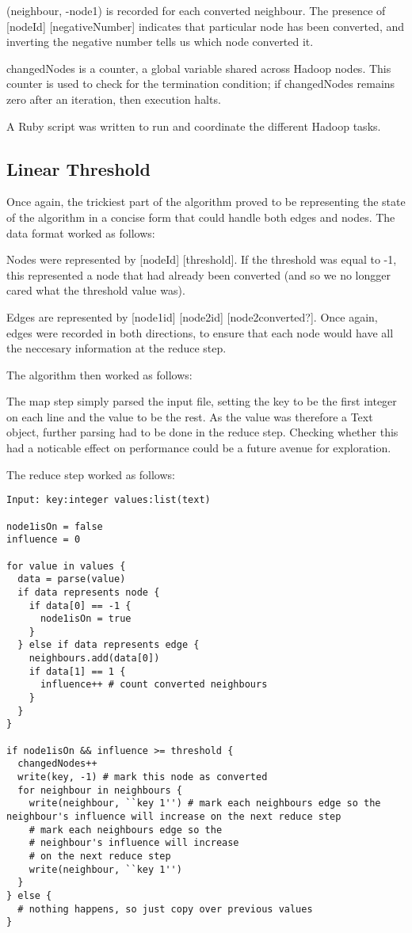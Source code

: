 (neighbour, -node1) is recorded for each converted neighbour. The presence of [nodeId] [negativeNumber] indicates that particular node has been converted, and inverting the negative number tells us which node converted it.

changedNodes is a counter, a global variable shared across Hadoop nodes. This counter is used to check for the termination condition; if changedNodes remains zero after an iteration, then execution halts.

A Ruby script was written to run and coordinate the different Hadoop tasks.

\subsection{Linear Threshold}

Once again, the trickiest part of the algorithm proved to be representing the state of the algorithm in a concise form that could handle both edges and nodes. The data format worked as follows:

Nodes were represented by [nodeId] [threshold]. If the threshold was equal to -1, this represented a node that had already been converted (and so we no longger cared what the threshold value was).

Edges are represented by [node1id] [node2id] [node2converted?]. Once again, edges were recorded in both directions, to ensure that each node would have all the neccesary information at the reduce step.

The algorithm then worked as follows:

The map step simply parsed the input file, setting the key to be the first integer on each line and the value to be the rest. As the value was therefore a Text object, further parsing had to be done in the reduce step. Checking whether this had a noticable effect on performance could be a future avenue for exploration.

The reduce step worked as follows:

\begin{verbatim}
Input: key:integer values:list(text)

node1isOn = false
influence = 0

for value in values {
  data = parse(value)
  if data represents node {
    if data[0] == -1 {
      node1isOn = true
    }
  } else if data represents edge {
    neighbours.add(data[0])
    if data[1] == 1 {
      influence++ # count converted neighbours
    }
  }
}

if node1isOn && influence >= threshold {
  changedNodes++
  write(key, -1) # mark this node as converted
  for neighbour in neighbours {
    write(neighbour, ``key 1'') # mark each neighbours edge so the neighbour's influence will increase on the next reduce step
  	# mark each neighbours edge so the 
  	# neighbour's influence will increase 
  	# on the next reduce step
    write(neighbour, ``key 1'') 
  }
} else {
  # nothing happens, so just copy over previous values
}
\end{verbatim}

